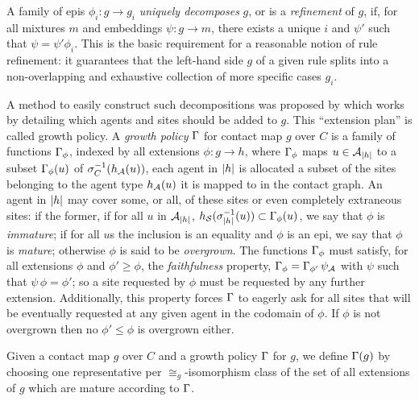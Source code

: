 A family of epis $\phi_i: g \to g_i$ \emph{uniquely decomposes} $g$,
or is a \emph{refinement} of $g$, if,
for all mixtures $m$ and embeddings $\psi: g \to m$,
there exists a unique $i$ and $\psi'$ such that $\psi = \psi' \phi_i$.
This is the basic requirement
for a reasonable notion of rule refinement:
it guarantees that the left-hand side $g$ of a given rule
splits into a non-overlapping and exhaustive collection
of more specific cases $g_i$.


A method to easily construct such decompositions
was proposed by \citet{refinement}
which works by detailing
which agents and sites should be added to $g$.
This ``extension plan'' is called growth policy.
A \emph{growth policy} $\Gamma$ for contact map $g$ over $C$
is a family of functions $\Gamma_\phi$,
indexed by all extensions $\phi: g \to h$,
where $\Gamma_\phi$ maps $u \in \mathcal{A}_{\left|h\right|}$ to
a subset $\Gamma_\phi(u)$ of $\sigma_C^{-1}(h_{\mathcal{A}}(u))$,
\ie each agent in $\left|h\right|$ is allocated
a subset of the sites belonging to the agent type $h_{\mathcal{A}}(u)$
it is mapped to in the contact graph.
%
An agent in $\left|h\right|$ may cover some, or all,
of these sites or even completely extraneous sites:
if the former, \ie if for all $u$ in $\mathcal{A}_{\left|h\right|}$,
$h_{\mathcal{S}}(\sigma_{\left|h\right|}^{-1}(u)) \subset \Gamma_\phi(u)$,
we say that $\phi$ is \emph{immature};
if for all $u$s the inclusion is an equality
and $\phi$ is an epi,
we say that $\phi$ is \emph{mature};
otherwise $\phi$ is said to be \emph{overgrown}.
The functions $\Gamma_\phi$ must satisfy,
for all extensions $\phi$ and $\phi' \geq \phi$,
the \emph{faithfulness} property,
$\Gamma_\phi = \Gamma_{\phi'} \, \psi_{\mathcal{A}}$
with $\psi$ such that $\psi \, \phi = \phi'$;
so a site requested by $\phi$
must be requested by any further extension.
Additionally, this property forces $\Gamma$ to eagerly ask
for all sites that will be eventually requested
at any given agent in the codomain of $\phi$.
If $\phi$ is not overgrown
then no $\phi' \leq \phi$ is overgrown either.

Given a contact map $g$ over $C$ and a growth policy $\Gamma$ for $g$,
we define $\Gamma(g)$ by choosing one representative
per $\cong_g$-isomorphism class of the set of all extensions of $g$
which are mature according to $\Gamma$.

